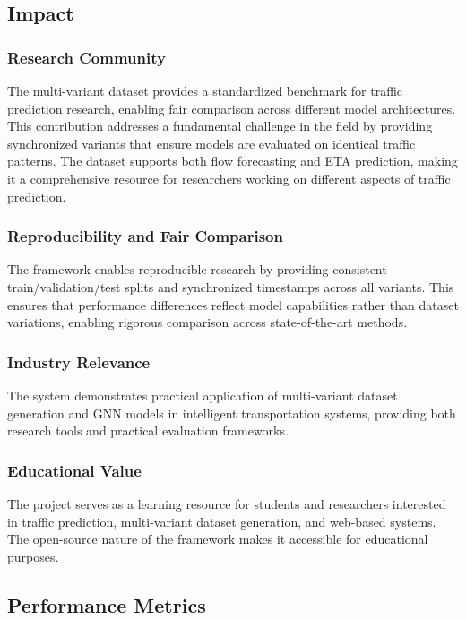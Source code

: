 \subsection{Impact}

\subsubsection{Research Community}
The multi-variant dataset provides a standardized benchmark for traffic prediction research, enabling fair comparison across different model architectures. This contribution addresses a fundamental challenge in the field by providing synchronized variants that ensure models are evaluated on identical traffic patterns. The dataset supports both flow forecasting and ETA prediction, making it a comprehensive resource for researchers working on different aspects of traffic prediction.

\subsubsection{Reproducibility and Fair Comparison}
The framework enables reproducible research by providing consistent train/validation/test splits and synchronized timestamps across all variants. This ensures that performance differences reflect model capabilities rather than dataset variations, enabling rigorous comparison across state-of-the-art methods.

\subsubsection{Industry Relevance}
The system demonstrates practical application of multi-variant dataset generation and GNN models in intelligent transportation systems, providing both research tools and practical evaluation frameworks.

\subsubsection{Educational Value}
The project serves as a learning resource for students and researchers interested in traffic prediction, multi-variant dataset generation, and web-based systems. The open-source nature of the framework makes it accessible for educational purposes.

\subsection{Performance Metrics}

